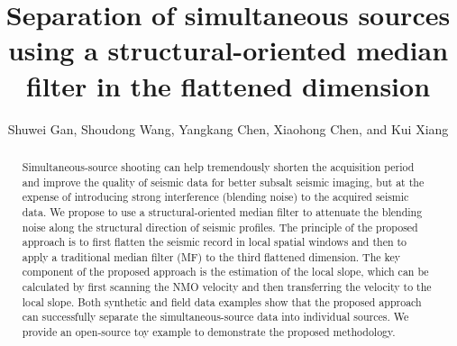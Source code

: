 \title{Separation of simultaneous sources using a structural-oriented median filter in the flattened dimension}
\author{Shuwei Gan\footnotemark[1] , Shoudong Wang\footnotemark[1], Yangkang Chen\footnotemark[2], Xiaohong Chen\footnotemark[1], and Kui Xiang\footnotemark[1]}

\address{
\footnotemark[1]State Key Laboratory of Petroleum Resources and Prospecting \\
China University of Petroleum \\
Fuxue Road 18th\\
Beijing, China, 102200 \\
gsw19900128@126.com \& wangshoudong@163.com \& chenxh@cup.edu.cn \& xiangkui15@126.com \\
\footnotemark[2]Bureau of Economic Geology, \\
Jackson School of Geosciences \\
The University of Texas at Austin \\
University Station, Box X \\
Austin, TX 78713-8924 \\
USA \\
}


\maketitle

\begin{abstract}
Simultaneous-source shooting can help tremendously shorten the acquisition period and improve the quality of seismic data for better subsalt seismic imaging, but at the expense of introducing strong interference (blending noise) to the acquired seismic data. We propose to use a structural-oriented median filter to attenuate the blending noise along the structural direction of seismic profiles. The principle of the proposed approach is to first flatten the seismic record in local spatial windows and then to apply a traditional median filter (MF) to the third flattened dimension. The key component of the proposed approach is the estimation of the local slope, which can be calculated by first scanning the NMO velocity and then transferring the velocity to the local slope. Both synthetic and field data examples show that the proposed approach can successfully separate the simultaneous-source data into individual sources. We provide an open-source toy example to  demonstrate  the proposed methodology. 
\end{abstract}


